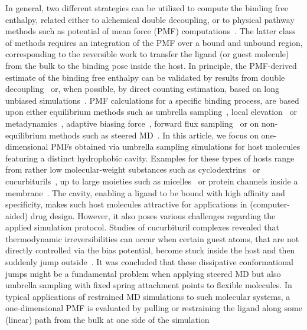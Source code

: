 \documentclass[9pt,lessons,pubversion]{livecoms}
\begin{document}
In general, two different strategies can be utilized to compute the binding free enthalpy, related either to alchemical double decoupling, or to physical pathway methods such as potential of mean force (PMF) computations~\cite{deng2009computations}.
The latter class of methods requires an integration of the PMF over a bound and unbound region, corresponding to the reversible work to transfer the ligand (or guest molecule) from the bulk to the binding pose inside the host.
In principle, the PMF-derived estimate of the binding free enthalpy can be validated by results from double decoupling~\cite{markthaler2017molecular, gumbart2012standard} or, when possible, 
by direct counting estimation, based on long unbiased simulations~\cite{pan2017quantitative, baz2018insights}.
PMF calculations for a specific binding process, are based upon either equilibrium methods such as umbrella sampling~\cite{torrie1974monte, torrie1977nonphysical}, local elevation~\cite{huber1994local} 
or metadynamics~\cite{laio2002escaping}, adaptive biasing force~\cite{darve2008adaptive}, forward flux sampling~\cite{allen2009forward} or on non-equilibrium methods such as steered MD~\cite{isralewitz2001steered_1}.
In this article, we focus on one-dimensional PMFs obtained via umbrella sampling simulations for host molecules featuring a distinct hydrophobic cavity.
Examples for these types of hosts range from rather low molecular-weight substances such as cyclodextrins~\cite{del2004cyclodextrins} or cucurbiturils~\cite{velez2012force, velez2013overcoming}, 
up to large moieties such as micelles~\cite{yordanova2017solute} or protein channels inside a membrane~\cite{allen2006ion, allen2006molecular, hub2010g_wham, flood2019atomistic}.
The cavity, enabling a ligand to be bound with high affinity and specificity, makes such host molecules attractive for applications in (computer-aided) drug design.
However, it also poses various challenges regarding the applied simulation protocol.
Studies of cucurbituril complexes revealed that thermodynamic irreversibilities can occur when certain guest atoms, that are not directly controlled via the bias potential, become stuck inside the host and then suddenly jump outside~\cite{velez2012force, velez2013overcoming}.
It was concluded that these dissipative conformational jumps might be a fundamental problem when applying steered MD but also umbrella sampling with fixed spring attachment points to flexible molecules.
In typical applications of restrained MD simulations to such molecular systems, a one-dimensional PMF is evaluated by pulling or restraining the ligand along some (linear) path from the bulk at one side of the simulation 
\end{document}
